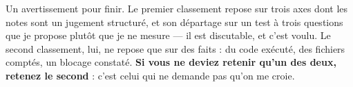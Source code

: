 \documentclass[10pt]{article}
\begin{document}
Un avertissement pour finir. Le premier classement repose sur trois axes dont les notes sont un
jugement structuré, et son départage sur un test à trois questions que je propose plutôt que je ne
mesure --- il est discutable, et c'est voulu. Le second classement, lui, ne repose que sur des faits :
du code exécuté, des fichiers comptés, un blocage constaté. \textbf{Si vous ne deviez retenir qu'un des
deux, retenez le second} : c'est celui qui ne demande pas qu'on me croie.
\end{document}
